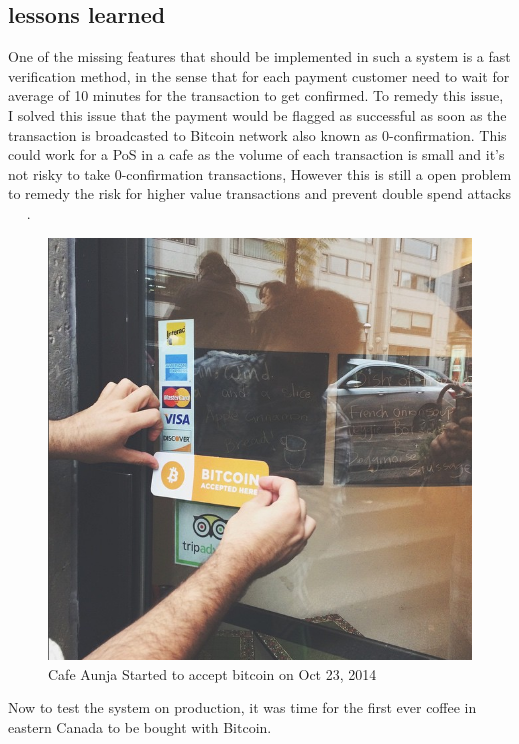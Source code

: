 \subsection{lessons learned}
One of the missing features that should be implemented in such a system is a fast verification method, in the sense that for each payment customer need to wait for average of 10 minutes for the transaction to get confirmed. To remedy this issue, I solved this issue that the payment would be flagged as successful as soon as the transaction is broadcasted to Bitcoin network also known as 0-confirmation. This could work for a PoS in a cafe as the volume of each transaction is small and it's not risky to take 0-confirmation transactions, However this is still a open problem to remedy the risk for higher value transactions and prevent double spend attacks ~\cite{karame2012two} ~\cite{bamert2013have}.

\begin{figure}[h]
\centering
\includegraphics[scale=0.5]{fig/cafeaunja.png}
  \caption{Cafe Aunja Started to accept bitcoin on Oct 23, 2014 }
\label{fig:cafeaunja}
\end{figure}







Now to test the system on production, it was time for the first ever coffee in eastern Canada to be bought with Bitcoin. 



